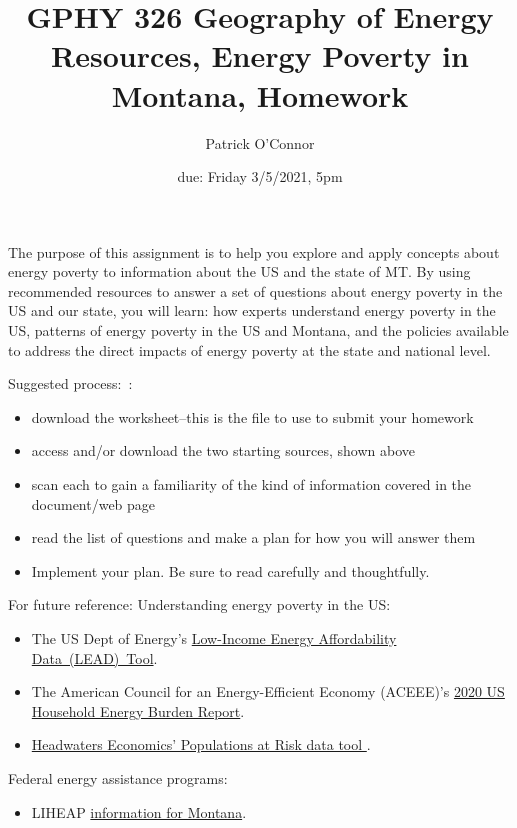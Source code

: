 \documentclass{article}
\title{GPHY 326 Geography of Energy Resources, Energy Poverty in
Montana, Homework  \hwnum}
\author{{Patrick O'Connor}}
\date{due: Friday 3/5/2021, 5pm}
\begin{document}
\maketitle

The purpose of this assignment is to help you explore and apply concepts about
energy poverty to information about the US and the state of MT. By using
recommended resources to answer a set of questions about energy poverty in the
US and our state, you will learn: how experts understand energy poverty in the
US, patterns of energy poverty in the US and Montana, and the policies available
to address the direct impacts of energy poverty at the state and national level.

Suggested process: :
\begin{itemize}
    \item download the worksheet--this is the file to use to submit your
    homework
    \item access and/or download the two starting sources, shown above
    \item scan each to gain a familiarity of the kind of information covered
    in the document/web page
    \item read the list of questions and make a plan for how you will answer
    them
    \item Implement your plan. Be sure to read carefully and thoughtfully. 
\end{itemize}

For future reference:
Understanding energy poverty in the US:
\begin{itemize}
  \item The US Dept of Energy's \href{https://www.energy.gov/eere/slsc/maps/lead-tool}{Low-Income
  Energy Affordability Data (LEAD) Tool}.
  \item The American Council for an Energy-Efficient Economy (ACEEE)'s
  \href{https://www.aceee.org/sites/default/files/pdfs/u2006.pdf}{2020 US
  Household Energy Burden Report}.
  \item \href{https://headwaterseconomics.org/tools/populations-at-risk/}
  {Headwaters Economics' Populations at Risk data tool }.
\end{itemize}
Federal energy assistance programs:
\begin{itemize}
  \item LIHEAP \href{https://dphhs.mt.gov/hcsd/energyassistance}{information for
  Montana}.

\end{itemize}
\end{document}
